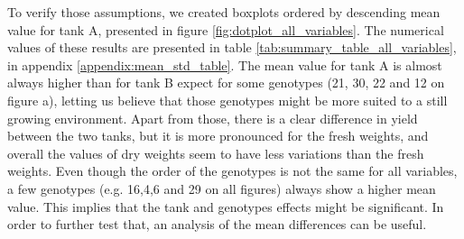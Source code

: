 To verify those assumptions, we created boxplots ordered by descending mean value for tank A, presented in figure \ref{fig:dotplot_all_variables}. The numerical values of these results are presented in table \ref{tab:summary_table_all_variables}, in appendix \ref{appendix:mean_std_table}.
The mean value for tank A is almost always higher than for tank B expect for some genotypes (21, 30, 22 and 12 on figure a), letting us believe that those genotypes might be more suited to a still growing environment. Apart from those, there is a clear difference in yield between the two tanks, but it is more pronounced for the fresh weights, and overall the values of dry weights seem to have less variations than the fresh weights. Even though the order of the genotypes is not the same for all variables, a few genotypes (e.g. 16,4,6 and 29 on all figures) always show a higher mean value.
This implies that the tank and genotypes effects might be significant. In order to further test that, an analysis of the mean differences can be useful. 


